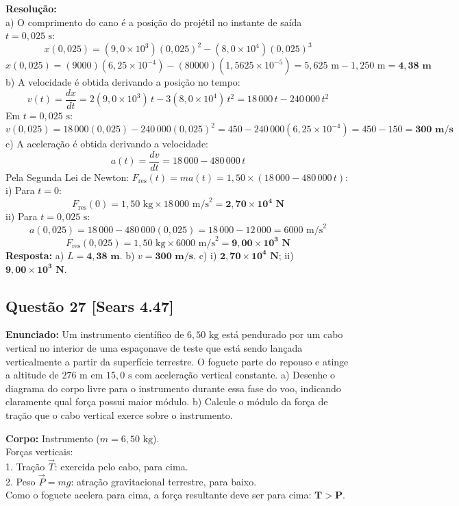 \documentclass[11pt,a4paper]{article}
\begin{document}
\noindent
\textbf{Resolução:}\\
a) O comprimento do cano é a posição do projétil no instante de saída $t = 0,025\text{ s}$:
\[ x(0,025) = (9,0 \times 10^3)(0,025)^2 - (8,0 \times 10^4)(0,025)^3 \]
\[ x(0,025) = (9000)(6,25 \times 10^{-4}) - (80000)(1,5625 \times 10^{-5}) = 5,625\text{ m} - 1,250\text{ m} = \mathbf{4,38\text{ m}} \]
b) A velocidade é obtida derivando a posição no tempo:
\[ v(t) = \frac{dx}{dt} = 2(9,0 \times 10^3)\,t - 3(8,0 \times 10^4)\,t^2 = 18\,000\,t - 240\,000\,t^2 \]
Em $t = 0,025\text{ s}$:
\[ v(0,025) = 18\,000(0,025) - 240\,000(0,025)^2 = 450 - 240\,000(6,25 \times 10^{-4}) = 450 - 150 = \mathbf{300\text{ m/s}} \]
c) A aceleração é obtida derivando a velocidade:
\[ a(t) = \frac{dv}{dt} = 18\,000 - 480\,000\,t \]
Pela Segunda Lei de Newton: $F_{\text{res}}(t) = m a(t) = 1,50 \times (18\,000 - 480\,000\,t)$:\\
i) Para $t = 0$:
\[ F_{\text{res}}(0) = 1,50\text{ kg} \times 18\,000\text{ m/s}^2 = \mathbf{2,70 \times 10^4\text{ N}} \]
ii) Para $t = 0,025\text{ s}$:
\[ a(0,025) = 18\,000 - 480\,000(0,025) = 18\,000 - 12\,000 = 6000\text{ m/s}^2 \]
\[ F_{\text{res}}(0,025) = 1,50\text{ kg} \times 6000\text{ m/s}^2 = \mathbf{9,00 \times 10^3\text{ N}} \]
\textbf{Resposta:} a) $L = \mathbf{4,38\text{ m}}$. b) $v = \mathbf{300\text{ m/s}}$. c) i) $\mathbf{2,70 \times 10^4\text{ N}}$; ii) $\mathbf{9,00 \times 10^3\text{ N}}$.

\vspace{0.3cm}
\subsection*{Questão 27 [Sears 4.47]}
\textbf{Enunciado:} Um instrumento científico de $6,50\text{ kg}$ está pendurado por um cabo vertical no interior de uma espaçonave de teste que está sendo lançada verticalmente a partir da superfície terrestre. O foguete parte do repouso e atinge a altitude de $276\text{ m}$ em $15,0\text{ s}$ com aceleração vertical constante. a) Desenhe o diagrama do corpo livre para o instrumento durante essa fase do voo, indicando claramente qual força possui maior módulo. b) Calcule o módulo da força de tração que o cabo vertical exerce sobre o instrumento.

\begin{dclbox}
\textbf{Corpo:} Instrumento ($m = 6,50\text{ kg}$).\\
Forças verticais:\\
1. Tração $\vec{T}$: exercida pelo cabo, para cima.\\
2. Peso $\vec{P} = mg$: atração gravitacional terrestre, para baixo.\\
Como o foguete acelera para cima, a força resultante deve ser para cima: $\mathbf{T > P}$.
\end{dclbox}
\end{document}
